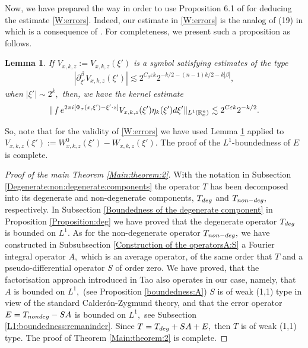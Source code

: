 \documentclass[12pt, reqno]{amsart}
\newtheorem{lemma}[theorem]{Lemma}
\theoremstyle{definition}
\theoremstyle{remark}
\numberwithin{equation}{section}
\begin{document}
Now, we have prepared the way in order to use Proposition 6.1 of \cite{Tao} for deducing the estimate \eqref{W:errors}. Indeed, our estimate in  \eqref{W:errors} is the analog of  (19) in \cite[Page 19]{Tao} which is a consequence of \cite[Proposition 6.1]{Tao}. For completeness, we present such a proposition as follows.
\begin{lemma}\label{Final:lemma}
    If $V_{x,k,z}:=V_{x,k,z}(\xi')$ is a symbol satisfying estimates of the type 
    \begin{align}
         | \partial_{\xi'}^{\beta}V_{x,k,z}(\xi')|\lesssim 2^{C_{\beta}\varepsilon k}2^{-k/2-(n-1)k/2-k|\beta|},
    \end{align}when $|\xi'|\sim 2^{k},$ then, we have the kernel estimate 
\begin{equation}\label{W:errors:cor}
    \Vert \smallint e^{2\pi i[\Phi_\tau(x,\xi') -\xi'\cdot z]}  V_{x,k,z}(\xi')\eta_{k}(\xi')d\xi'\Vert_{L^1(\mathbb{R}^n_x)}\lesssim 2^{C\varepsilon k}2^{-k/2}.
\end{equation}    
\end{lemma} So, note that for the validity of \eqref{W:errors}
 we have used Lemma \ref{Final:lemma} applied to $V_{x,k,z}(\xi'):=W^{0}_{x,k,z}(\xi')- W_{x,k,z}(\xi').$ The proof of the $L^1$-boundedness of $E$ is complete.

\begin{proof}[Proof of the main Theorem \ref{Main:theorem:2}] With the notation in Subsection \ref{Degenerate:non:degenerate:components} the operator $T$ has been decomposed into its degenerate and non-degenerate components, $T_{\textnormal{deg}}$ and $T_{\textnormal{non-deg}},$ respectively. In Subsection \ref{Boundedness of the degenerate component} in Proposition \ref{Proposition:deg} we have proved that the degenerate operator  $T_{\textnormal{deg}}$ is bounded on $L^1.$ As for the non-degenerate operator $T_{\textnormal{non-deg}},$ we have constructed in Subsubsection \ref{Construction of the operatorsA:S} a Fourier integral operator $A,$ which is an average operator, of the same order that $T$ and a pseudo-differential operator $S$ of order zero. We have proved, that the factorisation approach introduced in Tao \cite{Tao} also operates in our case, namely, that $A$ is bounded on $L^1,$ (see Proposition \ref{boundedness:A}) $S$ is of weak (1,1) type in view of the standard Calder\'on-Zygmund theory, and that the error operator  $E=T_{\textnormal{nondeg}}-SA$ is bounded on $L^1,$ see Subsection \ref{L1:boundedness:remaninder}. Since $T=T_{\textnormal{deg}}+SA+E,$ then $T$ is of weak (1,1) type. The proof of Theorem \ref{Main:theorem:2} is complete.    
\end{proof}
\end{document}

